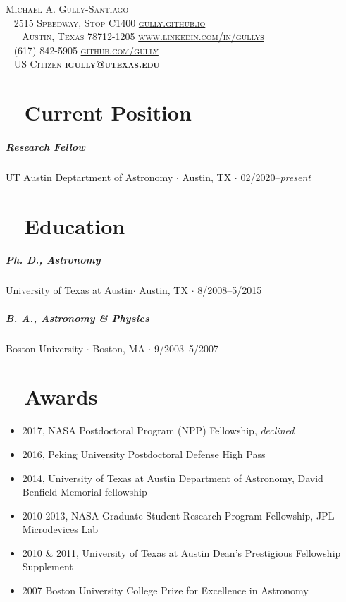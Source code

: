 \documentclass[10pt,letterpaper]{article}
\newcommand{\namestyle}{\Huge \scshape}
\newcommand{\addressstyle}{\color{addresscolor}  \footnotesize \sffamily \upshape}
\begin{document}
\begin{flushleft}
    \namestyle Michael A. Gully-Santiago \\[0.3em]
    \addressstyle
    \faMapMarker ~ 2515 Speedway, Stop C1400  \hfill \url{gully.github.io} ~ \faExternalLink \\
    ~ ~ Austin, Texas 78712-1205  \hfill  \url{www.linkedin.com/in/gullys} ~ \faLinkedin \\
    \faPhone ~ (617) 842-5905 \hfill \url{github.com/gully} ~ \faGithub \\
    \faGlobe ~ US Citizen \hfill \textbf{igully@utexas.edu} ~ \faInbox\\

\end{flushleft}

\small

\section*{\faToggleOn ~ Current Position}

\subparagraph{Research Fellow}
UT Austin Deptartment of Astronomy $\cdot$ Austin, TX $\cdot$ 02/2020--\emph{present}

\section*{\faGraduationCap ~ Education}

\subparagraph{Ph. D., Astronomy}
University of Texas at Austin$\cdot$ Austin, TX $\cdot$ 8/2008--5/2015

\subparagraph{B. A., Astronomy \& Physics}
Boston University $\cdot$ Boston, MA $\cdot$ 9/2003--5/2007


\section*{\faTrophy ~ Awards}

\begin{itemize}
    \item 2017, NASA Postdoctoral Program (NPP) Fellowship,  \emph{declined}
    \item 2016, Peking University Postdoctoral Defense High Pass
    \item 2014, University of Texas at Austin Department of Astronomy, David Benfield Memorial fellowship
    \item 2010-2013, NASA Graduate Student Research Program Fellowship, JPL Microdevices Lab
    \item 2010 \& 2011, University of Texas at Austin Dean's Prestigious Fellowship Supplement
    \item 2007 Boston University College Prize for Excellence in Astronomy
\end{itemize}
\end{document}
